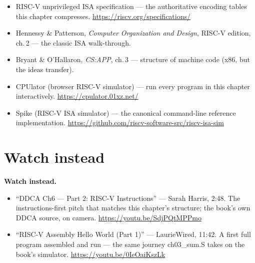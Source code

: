 \begin{itemize}
  \item RISC-V unprivileged ISA specification --- the authoritative
        encoding tables this chapter compresses.
        \url{https://riscv.org/specifications/}
  \item Hennessy \& Patterson, \emph{Computer Organization and Design},
        RISC-V edition, ch.\,2 --- the classic ISA walk-through.
  \item Bryant \& O'Hallaron, \emph{CS:APP}, ch.\,3 --- structure of
        machine code (x86, but the ideas transfer).
  \item CPUlator (browser RISC-V simulator) --- run every program in
        this chapter interactively.
        \url{https://cpulator.01xz.net/}
  \item Spike (RISC-V ISA simulator) --- the canonical command-line
        reference implementation.
        \url{https://github.com/riscv-software-src/riscv-isa-sim}
\end{itemize}

\section*{Watch instead}
\label{sec:watch03}

\begin{rulebox}
\textbf{Watch instead.}
\begin{itemize}
  \item ``DDCA Ch6 --- Part 2: RISC-V Instructions'' --- Sarah
        Harris, 2:48. The instructions-first pitch that matches this
        chapter's structure; the book's own DDCA source, on camera.
        \url{https://youtu.be/SdjPQtMPPmo}
  \item ``RISC-V Assembly Hello World (Part 1)'' --- LaurieWired,
        11:42. A first full program assembled and run --- the same
        journey ch03\_sum.S takes on the book's simulator.
        \url{https://youtu.be/0IeOaiKszLk}
\end{itemize}
\end{rulebox}

\chapternotes
